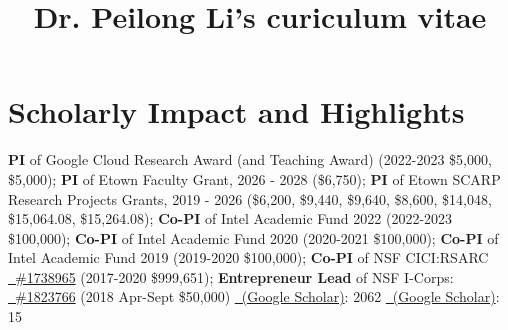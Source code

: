 \documentclass[11pt]{moderncv}
\title{Dr. Peilong Li's curiculum vitae}
\begin{document}
\maketitle

\section{Scholarly Impact and Highlights}
%
{\small 
\textbf{PI} of Google Cloud Research Award (and Teaching Award)
(2022-2023 \$5,000, \$5,000);\newline
\textbf{PI} of Etown Faculty Grant, 2026 - 2028 (\$6,750); \newline
\textbf{PI} of Etown SCARP Research Projects Grants, 2019 - 2026 (\$6,200, \$9,440, \$9,640, \$8,600, \$14,048, \$15,064.08, \$15,264.08); \newline
\textbf{Co-PI} of Intel Academic Fund 2022
   (2022-2023 \$100,000);\newline
\textbf{Co-PI} of Intel Academic Fund 2020
   (2020-2021 \$100,000);\newline
\textbf{Co-PI} of Intel Academic Fund 2019
   (2019-2020 \$100,000);\newline
\textbf{Co-PI} of NSF CICI:RSARC \href{https://www.nsf.gov/awardsearch/show-award?AWD_ID=1738965}
  {\color{color1}\homepagesymbol~\#1738965} (2017-2020 \$999,651);\newline
\textbf{Entrepreneur Lead} of NSF I-Corps: \href{https://nsf.gov/awardsearch/showAward?AWD_ID=1823766}
  {\color{color1}\homepagesymbol~\#1823766} (2018 Apr-Sept \$50,000)
}
%
%
%
{\small \href{https://scholar.google.com/citations?user=wFIBx94AAAAJ&hl}
  {\color{color2}\homepagesymbol~(Google Scholar)}: 2062}
%
%
{\small \href{https://scholar.google.com/citations?user=wFIBx94AAAAJ&hl}
  {\color{color2}\homepagesymbol~(Google Scholar)}: 15}
\end{document}
